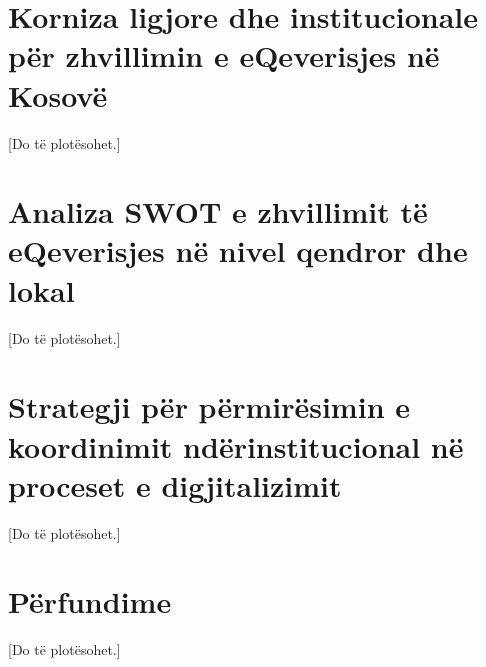 \documentclass[conference]{IEEEtran}
\begin{document}
\section{Korniza ligjore dhe institucionale për zhvillimin e eQeverisjes
në Kosovë}
\label{sec:korniza}
[Do të plotësohet.]

\section{Analiza SWOT e zhvillimit të eQeverisjes në nivel qendror dhe
lokal}
\label{sec:swot}
[Do të plotësohet.]

\section{Strategji për përmirësimin e koordinimit ndërinstitucional në
proceset e digjitalizimit}
\label{sec:strategjia}
[Do të plotësohet.]

\section{Përfundime}
\label{sec:perfundime}
[Do të plotësohet.]



\end{document}
